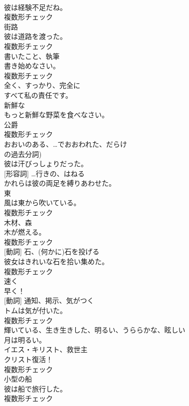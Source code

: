 \documentclass[8pt]{extreport}
\begin{document}
\begin{CJK}{UTF8}{min}
\\	彼は経験不足だね。	
\\	複数形チェック
\\	[名詞]	街路	
\\	彼は道路を渡った。	
\\	複数形チェック
\\	[名詞]	書いたこと、執筆	
\\	書き始めなさい。	
\\	複数形チェック
\\	[副詞]	全く、すっかり、完全に	
\\	すべて私の責任です。	
\\	[形容詞]	新鮮な	
\\	もっと新鮮な野菜を食べなさい。	
\\	[名詞]	公爵	
\\	複数形チェック
\\	[形容詞]	おおいのある、…でおおわれた、だらけ 
\\	の過去分詞)	
\\	彼は汗びっしょりだった。	
\\	[動詞] [形容詞]	…行きの、はねる	
\\	かれらは彼の両足を縛りあわせた。	
\\	[名詞]	東	
\\	風は東から吹いている。	
\\	複数形チェック
\\	[名詞]	木材、森	
\\	木が燃える。	
\\	複数形チェック
\\	[名詞] [動詞]	石、(何かに)石を投げる	
\\	彼女はきれいな石を拾い集めた。	
\\	複数形チェック
\\	[副詞]	速く	
\\	早く！	
\\	[名詞] [動詞]	通知、掲示、気がつく	
\\	トムは気が付いた。	
\\	複数形チェック
\\	[形容詞]	輝いている、生き生きした、明るい、うららかな、眩しい	
\\	月は明るい。	
\\	[名詞]	イエス・キリスト、救世主	
\\	クリスト復活！	
\\	複数形チェック
\\	[名詞]	小型の船	
\\	彼は船で旅行した。	
\\	複数形チェック

\end{CJK}
\end{document}
